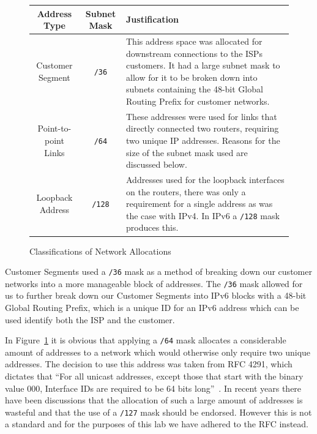 \begin{figure}[!ht]
    \caption{Classifications of Network Allocations}
    \label{figure:network-alloc-3}
    \centering
    \begin{tabular}{|c|c|p{5.5cm}|}

        \hline \textbf{Address Type} & \textbf{Subnet Mask} & \textbf{Justification} \\

        \hline
        Customer Segment & \texttt{/36} & This address space was allocated for
        downstream connections to the ISPs customers. It had a large subnet
        mask to allow for it to be broken down into subnets containing the
        48-bit Global Routing Prefix for customer networks.\\

        \hline
        Point-to-point Links & \texttt{/64} & These addresses were used for
        links that directly connected two routers, requiring two unique IP
        addresses. Reasons for the size of the subnet mask used are discussed
        below.\\

        \hline
        Loopback Address & \texttt{/128} & Addresses used for the loopback
        interfaces on the routers, there was only a requirement for a single
        address as was the case with IPv4. In IPv6 a \texttt{/128} mask
        produces this.\\

        \hline
    \end{tabular}
\end{figure}

Customer Segments used a \texttt{/36} mask as a method of breaking down our
customer networks into a more manageable block of addresses. The \texttt{/36}
mask allowed for us to further break down our Customer Segments into IPv6
blocks with a 48-bit Global Routing Prefix, which is a unique ID for an IPv6
address which can be used identify both the ISP and the customer.

In Figure~\ref{figure:network-alloc-3} it is obvious that applying a
\texttt{/64} mask allocates a considerable amount of addresses to a network
which would otherwise only require two unique addresses. The decision to use
this address was taken from RFC 4291, which dictates that ``For all unicast
addresses, except those that start with the binary value 000, Interface IDs are
required to be 64 bits long''~\cite{rfc4291}. In recent years there have been
discussions that the allocation of such a large amount of addresses is wasteful
and that the use of a \texttt{/127} mask should be endorsed. However this is
not a standard and for the purposes of this lab we have adhered to the RFC instead.
